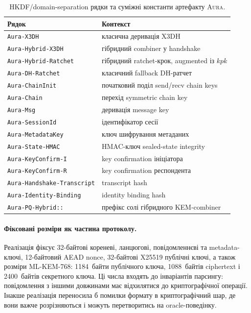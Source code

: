 \documentclass[11pt,a4paper]{article}
\theoremstyle{definition}
\newcommand{\Aura}{\mbox{\normalfont\scshape Aura}}
\begin{document}
\begin{table}[H]
\centering
\caption{HKDF/domain-separation рядки та суміжні константи артефакту \Aura{}.}
\label{tab:info-strings-ua}
\small
\begin{tabular}{@{}ll@{}}
\toprule
Рядок & Контекст \\
\midrule
\texttt{Aura-X3DH} & класична деривація X3DH \\
\texttt{Aura-Hybrid-X3DH} & гібридний combiner у handshake \\
\texttt{Aura-Hybrid-Ratchet} & гібридний ratchet-крок, augmented із $kpk$ \\
\texttt{Aura-DH-Ratchet} & класичний fallback DH-ратчет \\
\texttt{Aura-ChainInit} & початковий поділ send/recv chain keys \\
\texttt{Aura-Chain} & перехід symmetric chain key \\
\texttt{Aura-Msg} & деривація message key \\
\texttt{Aura-SessionId} & ідентифікатор сесії \\
\texttt{Aura-MetadataKey} & ключ шифрування метаданих \\
\texttt{Aura-State-HMAC} & HMAC-ключ sealed-state integrity \\
\texttt{Aura-KeyConfirm-I} & key confirmation ініціатора \\
\texttt{Aura-KeyConfirm-R} & key confirmation респондента \\
\texttt{Aura-Handshake-Transcript} & transcript hash \\
\texttt{Aura-Identity-Binding} & identity binding hash \\
\texttt{Aura-PQ-Hybrid::} & префікс солі гібридного KEM-combiner \\
\bottomrule
\end{tabular}
\end{table}

\paragraph{Фіксовані розміри як частина протоколу.}
Реалізація фіксує 32-байтові кореневі, ланцюгові, повідомленнєві та
metadata-ключі, 12-байтовий AEAD nonce, 32-байтові X25519 публічні
ключі, а також розміри ML-KEM-768: 1184~байти публічного ключа,
1088~байтів ciphertext і 2400~байтів секретного ключа. Ці числа
входять до інваріантів парсингу: повідомлення з іншими довжинами
має відхилятися до криптографічної операції. Інакше реалізація
переносила б помилки формату в криптографічний шар, де вони важче
розрізняються і можуть перетворитись на oracle-поведінку.
\end{document}
